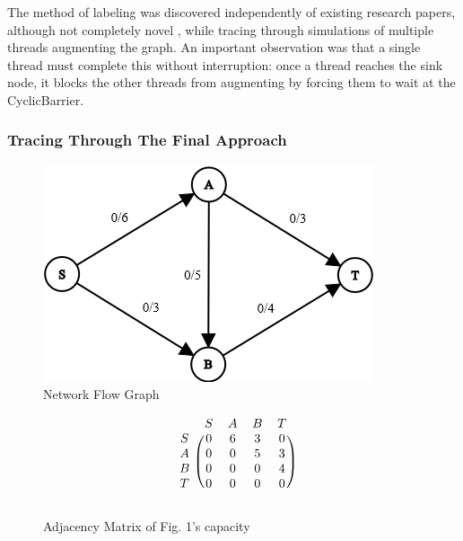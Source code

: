         The method of labeling was discovered independently of existing research papers, although not completely novel \cite{Jiang2013APF}, while tracing through simulations of multiple threads augmenting the graph. An important observation was that a single thread must complete this without interruption: once a thread reaches the sink node, it blocks the other threads from augmenting by forcing them to wait at the CyclicBarrier.
    
    \subsubsection{Tracing Through The Final Approach}
        \begin{figure}[h]
            \centering
            \includegraphics[scale=0.80]{figures/graph.png}
            \caption{Network Flow Graph}
        \end{figure}
    
        \begin{figure}[H]
            \centering
            \[
                \begin{blockarray}{ccccc}
                    & S & A & B & T \\
                    \begin{block}{c(cccc)}
                        S & 0 & 6 & 3 & 0 \\
                        A & 0 & 0 & 5 & 3 \\
                        B & 0 & 0 & 0 & 4 \\
                        T & 0 & 0 & 0 & 0 \\
                    \end{block}
                \end{blockarray}
            \]
            \caption{Adjacency Matrix of Fig. 1's capacity}
        \end{figure}
        
